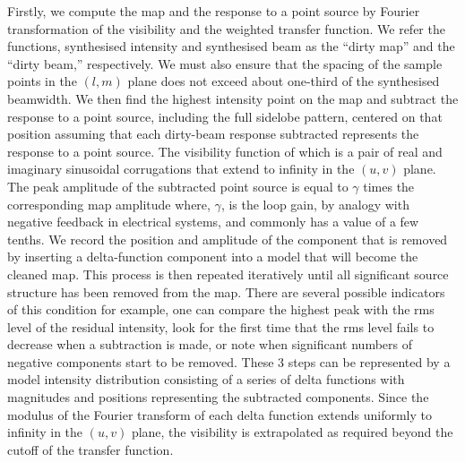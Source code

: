 Firstly, we compute the map and the response to a point source by Fourier transformation of the visibility and the weighted transfer function. We refer the functions, synthesised intensity and synthesised beam as the “dirty map” and the “dirty beam,” respectively. We must also ensure that the spacing of the sample points in the $(l,m)$ plane does not exceed about one-third of the synthesised beamwidth.
We then find the highest intensity point on the map and subtract the response to a point source, including the full sidelobe pattern, centered on that position assuming that each dirty-beam response subtracted represents the response to a point source. The visibility function of which is a pair of real and imaginary sinusoidal corrugations that extend to infinity in the $(u,v)$ plane. The peak amplitude of the subtracted point source is equal to $\gamma$ times the corresponding map amplitude where,  $\gamma$, is the loop gain, by analogy with negative feedback in electrical systems, and commonly has a value of a few tenths. We record the position and amplitude of the component that is removed by inserting a delta-function component into a model that will become the cleaned map.
This process is then repeated iteratively until all significant source structure has been removed from the map. There are several possible indicators of this condition for example, one can compare the highest peak with the rms level of the residual intensity, look for the first time that the rms level fails to decrease when a subtraction is made, or note when significant numbers of negative components start to be removed.
These 3 steps can be represented by a model intensity distribution consisting of a series of delta functions with magnitudes and positions representing the subtracted components. Since the modulus of the Fourier transform of each delta function extends uniformly to infinity in the $(u,v)$ plane, the visibility is extrapolated as required
beyond the cutoff of the transfer function.

